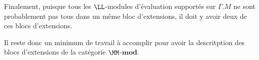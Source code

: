 \begin{itemize}
Finalement, puisque tous les $\LL$-modules d'évaluation supportés sur $\Gamma.M$ ne sont probablement pas tous dans un même bloc d'extensions, il doit y avoir deux de ces blocs d'extensions. 
\end{itemize}

Il reste donc un minimum de travail à accomplir pour avoir la descritption des blocs d'extensions de la catégorie $\MM$-$\mathbf{mod}$.





